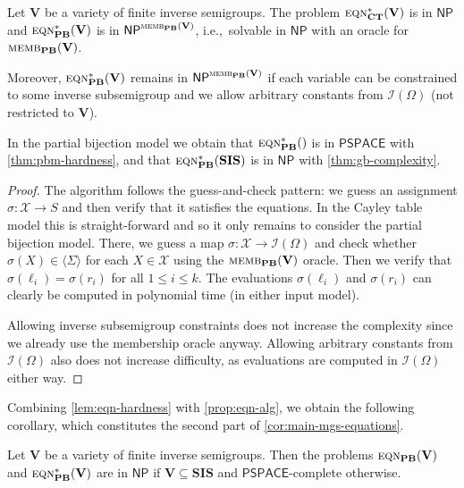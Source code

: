 \documentclass[anonymous,letter,UKenglish,cleveref,autoref,thm-restate]{lipics-v2021}
\renewcommand{\leq}{\leqslant}
\renewcommand{\le}{\leq}
\newcommand{\ie}{i.e.,~}
\newcommand{\sse}{\subseteq}
\newcommand{\gen}[1]{\langle #1 \rangle}
\newcommand{\NP}{\ensuremath{\mathsf{NP}}\xspace}
\newcommand{\PSPACE}{\ensuremath{\mathsf{PSPACE}}\xspace}
\newcommand{\vV}{\ensuremath{\mathbf{V}}}
\newcommand{\vSI}{\ensuremath{\mathbf{SIS}}}
\newcommand{\ISym}{\cI}
\newcommand{\cI}{\mathcal{I}}
\newcommand{\cX}{\mathcal{X}}
\theoremstyle{plain}
\theoremstyle{plain}
\newcommand{\dMemb}[2][]{\textup{\textsc{memb${}_{\mathbf{#1}}\expandafter\ifx\expandafter\relax\detokenize{#2}\relax\else(#2)\fi$}}}
\newcommand{\dEqn}[2][]{\textup{\textsc{eqn${}_{\mathbf{#1}}\expandafter\ifx\expandafter\relax\detokenize{#2}\relax\else(#2)\fi$}}}
\newcommand{\dEqnSys}[2][]{\textup{\textsc{eqn${}^\ast_{\mathbf{#1}}\expandafter\ifx\expandafter\relax\detokenize{#2}\relax\else(#2)\fi$}}}
\begin{document}
\begin{observation}\label{prop:eqn-alg}
  Let $\vV$ be a variety of finite inverse semigroups.
	The problem $\dEqnSys[CT]{\vV}$ is in $\NP$ and $\dEqnSys[PB]{\vV}$ is in $\NP^{\dMemb[PB]{\vV}}$, \ie solvable in $\NP$ with an oracle for $\dMemb[PB]{\vV}$.

  \smallskip
	
	Moreover, $\dEqnSys[PB]{\vV}$ remains in $\NP^{\dMemb[PB]{\vV}}$ if each variable can be constrained to some inverse subsemigroup and we allow arbitrary constants from $\ISym(\Omega)$ (not restricted to $\vV$).
\end{observation}

In the partial bijection model we obtain that $\dEqnSys[PB]{}$ is in $\PSPACE$ with \cref{thm:pbm-hardness}, and that $\dEqnSys[PB]{\vSI}$ is in $\NP$ with \cref{thm:gb-complexity}.

\begin{proof}
	The algorithm follows the guess-and-check pattern: we guess an assignment $\sigma\colon \cX \to S$ and then verify that it satisfies the equations.
	In the Cayley table model this is straight-forward and so it only remains to consider the partial bijection model.
	There, we guess a map $\sigma\colon \cX \to \ISym(\Omega)$ and check whether $\sigma(X) \in \gen{\Sigma}$ for each $X \in \cX$ using the $\dMemb[PB]{\vV}$ oracle.
	Then we verify that $\sigma(\ell_i) = \sigma(r_i)$ for all $1 \le i \le k$.
  The evaluations $\sigma(\ell_i)$ and $\sigma(r_i)$ can clearly be computed in polynomial time (in either input model).

	Allowing inverse subsemigroup constraints does not increase the complexity since we already use the membership oracle anyway.
	Allowing arbitrary constants from $\ISym(\Omega)$ also does not increase difficulty, as evaluations are computed in $\ISym(\Omega)$ either way.
\end{proof}

Combining \cref{lem:eqn-hardness} with \cref{prop:eqn-alg}, we obtain the following corollary, which constitutes the second part of \cref{cor:main-mgs-equations}.

 \begin{corollary}\label{cor:equations}
 	Let $\vV$ be a variety of finite inverse semigroups.
 	Then the problems $\dEqn[PB]{\vV}$ and $\dEqnSys[PB]{\vV}$ are in \NP if $\vV\sse \vSI$ and \PSPACE-complete otherwise.
 \end{corollary}
\end{document}
